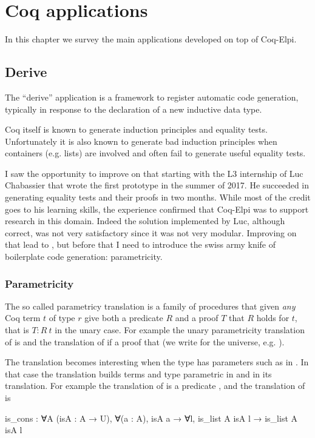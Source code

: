 \documentclass[a4paper, 11pt]{book}
\begin{document}
  
\chapter{Coq applications}

In this chapter we survey the main applications developed on top of Coq-Elpi.

\section{Derive}

The ``derive'' application is a framework to register automatic
code generation, typically in response to the declaration of a new inductive
data type.

Coq itself is known to generate induction principles and equality tests.
Unfortunately it is also known to generate bad induction principles when
containers (e.g. lists) are involved and often fail to generate useful
equality tests.

I saw the opportunity to improve on that starting with the L3 internship of
Luc Chabassier that wrote the first prototype in the summer of 2017.
He succeeded in generating
equality tests and their proofs in two months. While most of the credit goes to
his learning skills, the experience confirmed that Coq-Elpi was to support
research in this domain. Indeed the solution implemented by Luc, although
correct, was not very satisfactory since it was not very modular. Improving
on that lead to \cite{tassi:hal-01897468}, but before that I need to introduce
the swiss army knife of boilerplate code generation: parametricity.

\subsection{Parametricity}

The so called parametricy translation \cite{keller_et_al:LIPIcs.CSL.2012.381}
is a family of procedures that given \emph{any} Coq term $t$ of type $r$
give both a predicate $R$ and a proof $T$ that $R$ holds for $t$, that is $T : R~t$
in the unary case. For example the unary parametricity translation of
 is  and
the translation of  if a proof that  (we write
 for the universe, e.g. ).

The translation becomes interesting when the type has parameters such as
 in . In that case the translation builds
terms and type parametric in  and in its translation. For example
the translation of  is a predicate
,
and the translation of  is
\begin{coqcode}
is_cons : ∀A (isA : A → U),
  ∀(a : A), isA a →
  ∀l, is_list A isA l →
    is_list A isA l
\end{coqcode}
\end{document}
